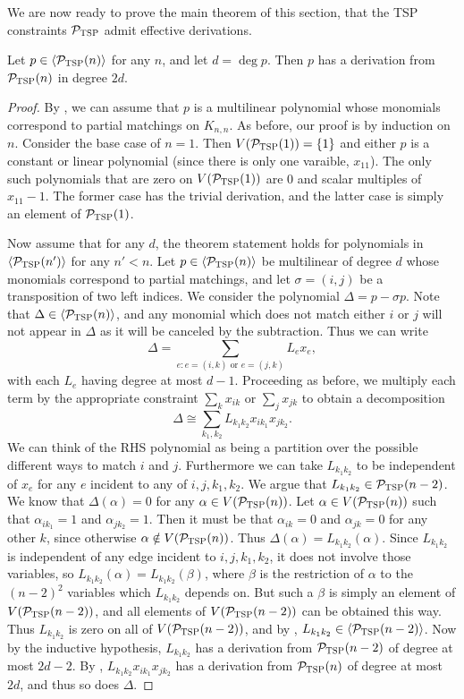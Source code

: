 We are now ready to prove the main theorem of this section, that the \textsc{TSP} constraints $\mathcal P_{\textsc{TSP}}$ admit effective derivations. 
\begin{theorem}\label{thm:tsp-effective}
Let $p \in \langle \mathcal P_{\textsc{TSP}}(n) \rangle$ for any $n$, and let $d = \deg p$. Then $p$ has a derivation from $\mathcal P_{\textsc{TSP}}(n)$ in degree $2d$. 
\end{theorem}
\begin{proof}
By , we can assume that $p$ is a multilinear polynomial whose monomials correspond to partial matchings on $K_{n,n}$.
As before, our proof is by induction on $n$. Consider the base case of $n = 1$. 
Then $V(\mathcal P_{\textsc{TSP}}(1)) = \{1\}$ and either $p$ is a constant or linear polynomial (since there is only one varaible, $x_{11}$).
The only such polynomials that are zero on $V(\mathcal P_{\textsc{TSP}}(1))$ are $0$ and scalar multiples of $x_{11} - 1$. 
The former case has the trivial derivation, and the latter case is simply an element of $\mathcal P_{\textsc{TSP}}(1)$. 

Now assume that for any $d$, the theorem statement holds for polynomials in $\langle \mathcal P_{\textsc{TSP}}(n') \rangle$ for any $n' < n$. 
Let $p \in \langle \mathcal P_{\textsc{TSP}}(n) \rangle$ be multilinear of degree $d$ whose monomials correspond to partial matchings, and let $\sigma = (i,j)$ be a transposition of two left indices.
We consider the polynomial $\Delta = p - \sigma p$. Note that $\Delta \in \langle \mathcal P_{\textsc{TSP}}(n) \rangle$, and any monomial which does not match either $i$ or $j$ will not appear in $\Delta$ as it will be canceled by the subtraction.
Thus we can write
\[\Delta = \sum_{e: e = (i,k) \text{ or } e = (j,k)} L_e x_e,\]
with each $L_e$ having degree at most $d-1$. Proceeding as before, we multiply each term by the appropriate constraint $\sum_k x_{ik}$ or $\sum_j x_{jk}$ to obtain a decomposition
\[\Delta \cong \sum_{k_1,k_2} L_{k_1k_2} x_{ik_1}x_{jk_2}.\]
We can think of the RHS polynomial as being a partition over the possible different ways to match $i$ and $j$.
Furthermore we can take $L_{k_1k_2}$ to be independent of $x_e$ for any $e$ incident to any of $i,j,k_1,k_2$. 
We argue that $L_{k_1k_2} \in \mathcal P_{\textsc{TSP}}(n-2)$. We know that $\Delta(\alpha) = 0$ for any $\alpha \in V(\mathcal P_{\textsc{TSP}}(n))$. Let $\alpha \in V(\mathcal P_{\textsc{TSP}}(n))$ such that $\alpha_{ik_1} = 1$ and $\alpha_{jk_2} = 1$. 
Then it must be that $\alpha_{ik} = 0$ and $\alpha_{jk} = 0$ for any other $k$, since otherwise $\alpha \notin V(\mathcal P_{\textsc{TSP}}(n))$.
Thus $\Delta(\alpha) = L_{k_1k_2}(\alpha)$. Since $L_{k_1k_2}$ is independent of any edge incident to $i,j,k_1,k_2$, it does not involve those variables, so $L_{k_1k_2}(\alpha) = L_{k_1k_2}(\beta)$, where $\beta$ is the restriction of $\alpha$ to the $(n-2)^2$ variables which $L_{k_1k_2}$ depends on. But such a $\beta$ is simply an element of $V(\mathcal P_{\textsc{TSP}}(n-2))$, and all elements of $V(\mathcal P_{\textsc{TSP}}(n-2))$ can be obtained this way. Thus $L_{k_1k_2}$ is zero on all of $V(\mathcal P_{\textsc{TSP}}(n-2))$, and by , $L_{k_1k_2} \in \langle \mathcal P_{\textsc{TSP}}(n-2) \rangle$. Now by the inductive hypothesis, $L_{k_1k_2}$ has a derivation from $\mathcal P_{\textsc{TSP}}(n-2)$ of degree at most $2d-2$. By , $L_{k_1k_2}x_{ik_1}x_{jk_2}$ has a derivation from $\mathcal P_{\textsc{TSP}}(n)$ of degree at most $2d$, and thus so does $\Delta$.


\end{proof}

